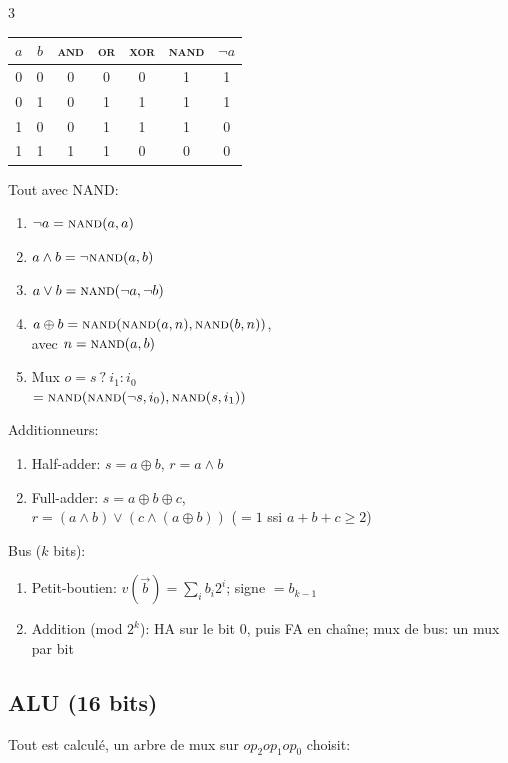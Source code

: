 \documentclass[12pt, a4paper]{article}
\begin{document}
\begin{multicols*}{3}
	\begin{tabular}{|c|c|c|c|c|c|c|}
		\hline
		$a$ & $b$ & \textsc{and} & \textsc{or} & \textsc{xor} & \textsc{nand} & $\lnot a$ \\
		\hline
		0   & 0   & 0            & 0           & 0            & 1             & 1         \\
		0   & 1   & 0            & 1           & 1            & 1             & 1         \\
		1   & 0   & 0            & 1           & 1            & 1             & 0         \\
		1   & 1   & 1            & 1           & 0            & 0             & 0         \\
		\hline
	\end{tabular}
 
	Tout avec NAND:
	\begin{enumerate}[\roman*.]
		\item $\lnot a=\textsc{nand}(a,a)$
		\item $a\land b=\lnot\textsc{nand}(a,b)$
		\item $a\lor b=\textsc{nand}(\lnot a,\lnot b)$
		\item $a\oplus b=\textsc{nand}(\textsc{nand}(a,n),\textsc{nand}(b,n))$,\\avec $n=\textsc{nand}(a,b)$
		\item Mux $o=s\ ?\ i_1:i_0$\\$=\textsc{nand}(\textsc{nand}(\lnot s,i_0),\textsc{nand}(s,i_1))$
	\end{enumerate}
 
	Additionneurs:
	\begin{enumerate}[\roman*.]
		\item Half-adder: $s = a\oplus b$, $r = a\land b$
		\item Full-adder: $s = a\oplus b\oplus c$,\\$r = (a\land b)\lor(c\land(a\oplus b))$ ($=1$ ssi $a+b+c\geq2$)
	\end{enumerate}
 
	Bus ($k$ bits):
	\begin{enumerate}[\roman*.]
		\item Petit-boutien: $v(\vec{b})=\sum_ib_i2^i$; signe $=b_{k-1}$
		\item Addition (mod $2^k$): HA sur le bit 0, puis FA en chaîne; mux de bus: un mux par bit
	\end{enumerate}
 
	\subsection{ALU (16 bits)}
	Tout est calculé, un arbre de mux sur $op_2op_1op_0$ choisit:


\end{multicols*}
\end{document}
